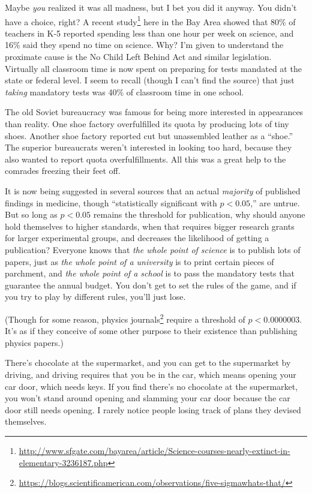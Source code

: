{{{
 Maybe \textit{you} realized it was all madness, but I bet you did
it anyway. You didn't have a choice, right? A recent
study\footnote{\url{http://www.sfgate.com/bayarea/article/Science-courses-nearly-extinct-in-elementary-3236187.php}} here in the Bay Area showed that 80\% of teachers in K-5 reported
spending less than one hour per week on science, and 16\% said they
spend no time on science. Why? I'm given to understand
the proximate cause is the No Child Left Behind Act and similar
legislation. Virtually all classroom time is now spent on preparing for
tests mandated at the state or federal level. I seem to recall (though
I can't find the source) that just \textit{taking}
mandatory tests was 40\% of classroom time in one school.}

{
 The old Soviet bureaucracy was famous for being more interested in
appearances than reality. One shoe factory overfulfilled its quota by
producing lots of tiny shoes. Another shoe factory reported cut but
unassembled leather as a ``shoe.''
The superior bureaucrats weren't interested in looking
too hard, because they also wanted to report quota overfulfillments.
All this was a great help to the comrades freezing their feet off.}

{
 It is now being suggested in several sources that an actual
\textit{majority} of published findings in medicine, though
``statistically significant with $p < 0.05$,'' are untrue.
But so long as $p < 0.05$
remains the threshold for publication, why should anyone hold
themselves to higher standards, when that requires bigger research
grants for larger experimental groups, and decreases the likelihood of
getting a publication? Everyone knows that \textit{the whole point of
science} is to publish lots of papers, just as \textit{the whole point
of a university} is to print certain pieces of parchment, and
\textit{the whole point of a school} is to pass the mandatory tests
that guarantee the annual budget. You don't get to set
the rules of the game, and if you try to play by different rules,
you'll just lose.}

{
 (Though for some reason, physics journals\footnote{\url{https://blogs.scientificamerican.com/observations/five-sigmawhats-that/}} require a threshold of $p < 0.0000003$. It's as if they conceive of some
other purpose to their existence than publishing physics papers.)}

{
 There's chocolate at the supermarket, and you can
get to the supermarket by driving, and driving requires that you be in
the car, which means opening your car door, which needs keys. If you
find there's no chocolate at the supermarket, you
won't stand around opening and slamming your car door
because the car door still needs opening. I rarely notice people losing
track of plans they devised themselves.}

}}
